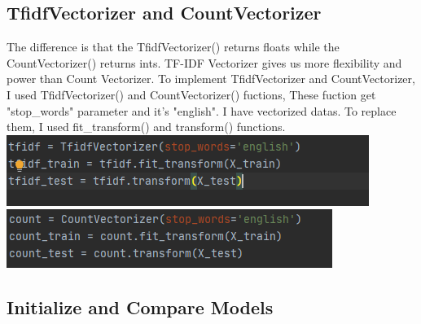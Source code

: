 \documentclass[onecolumn]{article}
\begin{document}
\subsection{TfidfVectorizer and CountVectorizer}
The difference is that the TfidfVectorizer() returns floats while the CountVectorizer() returns ints. TF-IDF Vectorizer gives us more flexibility and power than Count Vectorizer.\bigskip\newline
\noindent
To implement TfidfVectorizer and CountVectorizer, I used TfidfVectorizer() and  CountVectorizer() fuctions, These fuction get "stop\_words" parameter and it's "english".\bigskip\newline
\noindent
I have vectorized datas. To replace them, I used fit\_transform() and transform() functions.
\includegraphics[scale=0.6]{fig/4.PNG}
\includegraphics[scale=0.7]{fig/5.PNG}
\bigskip
\subsection{Initialize and Compare Models}
\end{document}
